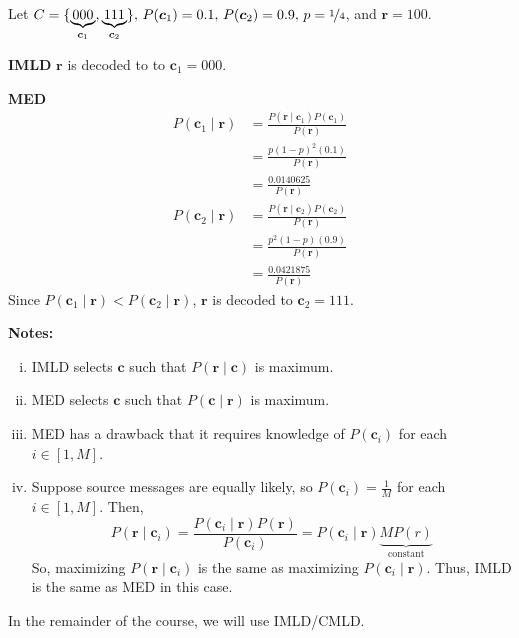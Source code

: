 \begin{exbox}
    \begin{example}[IMLD != MED]
        Let $ C=\{\underbrace{000}_{\bm{c}_1},\underbrace{111}_{\bm{c}_2}\},\,
            P(\bm{c}_1)=0.1,\, P(\bm{c}_2)=0.9,\, p=\nicefrac{1}{4} $, and $ \bm{r}=100 $.

        \textbf{IMLD} $ \bm{r} $ is decoded to to $ \bm{c}_1 = 000 $.

        \textbf{MED}
        \begin{align*}
            P(\bm{c}_1\mid \bm{r})
             & =\frac{P(\bm{r}\mid \bm{c}_1)P(\bm{c}_1)}{P(\bm{r})} \\
             & =\frac{p(1-p)^2(0.1)}{P(\bm{r})}                     \\
             & =\frac{0.0140625}{P(\bm{r})}
        \end{align*}
        \begin{align*}
            P(\bm{c}_2\mid \bm{r})
             & =\frac{P(\bm{r}\mid \bm{c}_2)P(\bm{c}_2)}{P(\bm{r})} \\
             & =\frac{p^2(1-p)(0.9)}{P(\bm{r})}                     \\
             & =\frac{0.0421875}{P(\bm{r})}
        \end{align*}
        Since $ P(\bm{c}_1\mid \bm{r})<P(\bm{c}_2\mid \bm{r}) $,
        $ \bm{r} $ is decoded to $ \bm{c}_2=111 $.
    \end{example}
\end{exbox}

\textbf{Notes:}
\begin{enumerate}[(i)]
    \item IMLD selects $ \bm{c} $ such that $ P(\bm{r}\mid \bm{c}) $ is maximum.
    \item MED selects $ \bm{c} $ such that $ P(\bm{c}\mid \bm{r}) $ is maximum.
    \item MED has a drawback that it requires knowledge of $ P(\bm{c}_i) $ for
          each $ i\in [1,M] $.
    \item Suppose source messages are equally likely, so
          $ P(\bm{c}_i)=\frac{1}{M} $ for each $ i\in[1,M] $.
          Then,
          \[ P(\bm{r}\mid \bm{c}_i)=\frac{P(\bm{c}_i\mid \bm{r})P(\bm{r})}{P(\bm{c}_i)}
              =P(\bm{c}_i\mid \bm{r}) \underbrace{M P(r)}_{\text{constant}}\]
          So, maximizing $ P(\bm{r}\mid \bm{c}_i) $ is the same as maximizing
          $ P(\bm{c}_i\mid \bm{r}) $. Thus, IMLD is the same as MED in this case.
\end{enumerate}
In the remainder of the course, we will use IMLD/CMLD.
